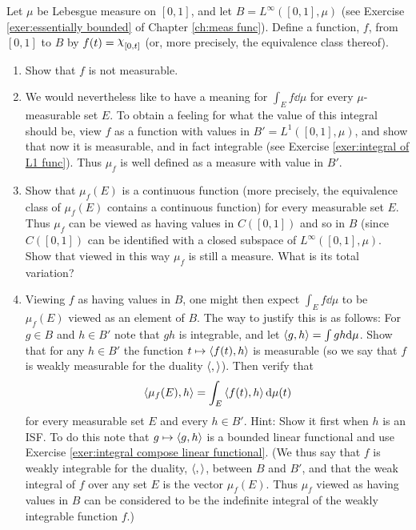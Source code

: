 \begin{enumerate}[label=\arabic*),ref=\arabic*]
Let $\mu$ be Lebesgue measure on $[0,1]$, and let $B=L^\infty([0,1],\mu)$ (see Exercise \ref{exer:essentially bounded} of Chapter \ref{ch:meas func}). Define a function, $f$, from $[0,1]$ to $B$ by $f(t)=\idf{[0,t]}$ (or, more precisely, the equivalence class thereof).

\begin{enumerate}[label=\alph*),ref=\theenumi\alph*)]
    \item Show that $f$ is not measurable.

    \item We would nevertheless like to have a meaning for $\int_Ef\dd\mu$ for every $\mu$-measurable set $E$. To obtain a feeling for what the value of this integral should be, view $f$ as a function with values in $B'=L^1([0,1],\mu)$, and show that now it is measurable, and in fact integrable (see Exercise \ref{exer:integral of L1 func}). Thus $\mu_f$ is well defined as a measure with value in $B'$.

    \item Show that $\mu_f(E)$ is a continuous function (more precisely, the equivalence class of $\mu_f(E)$ contains a continuous function) for every measurable set $E$. Thus $\mu_f$ can be viewed as having values in $C([0,1])$ and so in $B$ (since $C([0,1])$ can be identified with a closed subspace of $L^\infty([0,1],\mu)$. Show that viewed in this way $\mu_f$ is still a measure. What is its total variation?

    \item \label{exer:item:integral w duality}
    Viewing $f$ as having values in $B$, one might then expect $\int_Ef\dd\mu$ to be $\mu_f(E)$ viewed as an element of $B$. The way to justify this is as follows: For $g \in B$ and $h\in B'$ note that $gh$ is integrable, and let $\left\langle g,h\right\rangle=\int gh\dd\mu$. Show that for any $h\in B'$ the function $t\mapsto\left\langle f(t), h\right\rangle$ is measurable (so we say that $f$ is weakly measurable for the duality $\left\langle,\right\rangle$). Then verify that $$\left\langle\mu_f(E),h\right\rangle=\int_E\left\langle f(t),h\right\rangle\dd\mu(t)$$ for every measurable set $E$ and every $h \in B'$. Hint: Show it first when $h$ is an ISF. To do this note that $g\mapsto\left\langle g,h\right\rangle$ is a bounded linear functional and use Exercise \ref{exer:integral compose linear functional}. (We thus say that $f$ is weakly integrable for the duality, $\left\langle,\right\rangle$, between $B$ and $B'$, and that the weak integral of $f$ over any set $E$ is the vector $\mu_f(E)$. Thus $\mu_f$ viewed as having values in $B$ can be considered to be the indefinite integral of the weakly integrable function $f$.)
    

\end{enumerate}
\end{enumerate}
